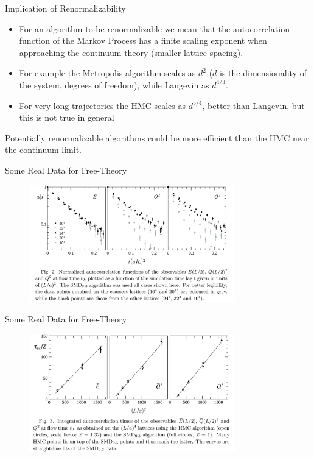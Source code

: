 \documentclass[10pt]{beamer}
\begin{document}
\begin{frame}{Implication of Renormalizability}
    \begin{itemize}
        \item For an algorithm to be renormalizable we mean that the autocorrelation function of the Markov Process has a finite scaling exponent when approaching the continuum theory (smaller lattice spacing).
        \item For example the Metropolis algorithm scales as $d^2$ ($d$ is the dimensionality of the system, degrees of freedom), while Langevin as $d^{4/3}$.
        \item For very long trajectories the HMC scales as $d^{5/4}$, better than Langevin, but this is not true in general
    \end{itemize}
    Potentially renormalizable algorithms could be more efficient than the HMC near the continuum limit.
\end{frame}

\begin{frame}{Some Real Data for Free-Theory}
    \begin{figure}
        \includegraphics[width=0.8\textwidth]{autocorr.png}
    \end{figure}
\end{frame}

\begin{frame}{Some Real Data for Free-Theory}
    \begin{figure}
        \includegraphics[width=0.8\textwidth]{scaling.png}
    \end{figure}
\end{frame}
\end{document}
